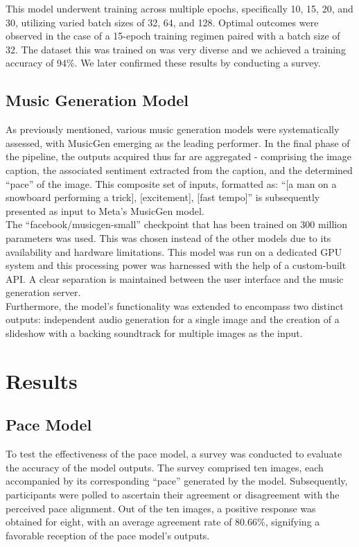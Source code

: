 \documentclass[conference]{IEEEtran}
\begin{document}
This model underwent training across multiple epochs, specifically 10, 15, 20, and 30, utilizing varied batch sizes of 32, 64, and 128. Optimal outcomes were observed in the case of a 15-epoch training regimen paired with a batch size of 32. The dataset this was trained on was very diverse and we achieved a training accuracy of 94\%. We later confirmed these results by conducting a survey.

\subsection{Music Generation Model}

As previously mentioned, various music generation models were systematically assessed, with MusicGen emerging as the leading performer. In the final phase of the pipeline, the outputs acquired thus far are aggregated - comprising the image caption, the associated sentiment extracted from the caption, and the determined ``pace'' of the image. This composite set of inputs, formatted as: ``[a man on a snowboard performing a trick], [excitement], [fast tempo]'' is subsequently presented as input to Meta's MusicGen model.
\\

The ``facebook/musicgen-small'' checkpoint that has been trained on 300 million parameters was used. This was chosen instead of the other models due to its availability and hardware limitations. This model was run on a dedicated GPU system and this processing power was harnessed with the help of a custom-built API. A clear separation is maintained between the user interface and the music generation server.
\\

Furthermore, the model's functionality was extended to encompass two distinct outputs: independent audio generation for a single image and the creation of a slideshow with a backing soundtrack for multiple images as the input.

\section*{Results}

\subsection*{Pace Model}

To test the effectiveness of the pace model, a survey was conducted to evaluate the accuracy of the model outputs. The survey comprised ten images, each accompanied by its corresponding ``pace'' generated by the model. Subsequently, participants were polled to ascertain their agreement or disagreement with the perceived pace alignment. Out of the ten images, a positive response was obtained for eight, with an average agreement rate of 80.66\%, signifying a favorable reception of the pace model's outputs.
\\
\end{document}

